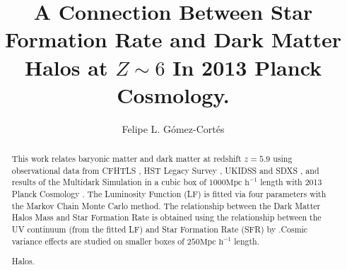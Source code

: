 \documentclass[manuscript]{aastex}
\begin{document}
\title{A Connection Between Star Formation Rate and Dark Matter Halos at 
$Z\sim6$ In 2013 Planck Cosmology.}

\author{Felipe L. G\'omez-Cort\'es }

\begin{abstract}
This work relates baryonic matter and dark matter at redshift $z=5.9$ using 
observational data from CFHTLS \citep{willott13}, HST Legacy Survey
\citep{bouwens14,finkelstein14}, UKIDSS and SDXS \citep{mclure09}, and results of 
the Multidark Simulation \citep{klypin14} in a cubic box of $1000 \textrm{Mpc 
h}^{-1}$ length with 2013 Planck Cosmology \citep{planck1}. The Luminosity Function (LF) is 
fitted via four parameters with the Markov Chain Monte Carlo method. The 
relationship between the Dark Matter Halos Mass and Star Formation Rate is 
obtained using the relationship between the UV  continuum (from the fitted LF) 
and Star Formation Rate (SFR) by \cite{kennicutt98}.Cosmic variance effects are 
studied on smaller boxes of $250 \textrm{Mpc h}^{-1}$ length.

Halos.
\end{abstract}

%






\acknowledgments
\appendix

\end{document}
